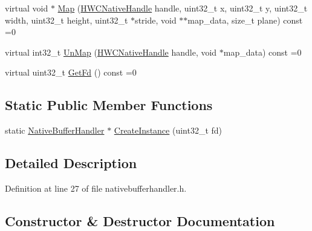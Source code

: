 \begin{DoxyCompactItemize}
\item 
virtual void $\ast$ \mbox{\hyperlink{classhwcomposer_1_1NativeBufferHandler_a4ef1e64030d28540265fac46d503e9b8}{Map}} (\mbox{\hyperlink{alios_2platformdefines_8h_ac0a2eaf260f556d17fe489911f017bdf}{H\+W\+C\+Native\+Handle}} handle, uint32\+\_\+t x, uint32\+\_\+t y, uint32\+\_\+t width, uint32\+\_\+t height, uint32\+\_\+t $\ast$stride, void $\ast$$\ast$map\+\_\+data, size\+\_\+t plane) const =0
\item 
virtual int32\+\_\+t \mbox{\hyperlink{classhwcomposer_1_1NativeBufferHandler_ae0da63bfef3f8342460fa1a958f8359c}{Un\+Map}} (\mbox{\hyperlink{alios_2platformdefines_8h_ac0a2eaf260f556d17fe489911f017bdf}{H\+W\+C\+Native\+Handle}} handle, void $\ast$map\+\_\+data) const =0
\item 
virtual uint32\+\_\+t \mbox{\hyperlink{classhwcomposer_1_1NativeBufferHandler_adb5a4c6d14c012f8a5c71fbb2c984438}{Get\+Fd}} () const =0
\end{DoxyCompactItemize}
\subsection*{Static Public Member Functions}
\begin{DoxyCompactItemize}
\item 
static \mbox{\hyperlink{classhwcomposer_1_1NativeBufferHandler}{Native\+Buffer\+Handler}} $\ast$ \mbox{\hyperlink{classhwcomposer_1_1NativeBufferHandler_a7cd90f5d6e7ba6a46758e7891168c332}{Create\+Instance}} (uint32\+\_\+t fd)
\end{DoxyCompactItemize}


\subsection{Detailed Description}


Definition at line 27 of file nativebufferhandler.\+h.



\subsection{Constructor \& Destructor Documentation}
\mbox{\label{classhwcomposer_1_1NativeBufferHandler_a646333d259ac8d876282312b1dcd599f}} 
